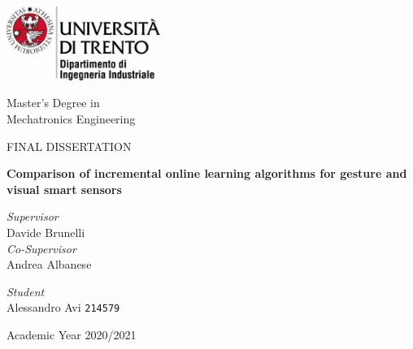 \documentclass [titlepage]{article}
\begin{document}
\begin{titlepage}

    \includegraphics[width=5cm]{Figures/LogoPiccolo.jpg}

   \begin{center}
       \Large{Master's Degree in\\Mechatronics Engineering}

       \vspace{0.5cm}
       \Large{FINAL DISSERTATION}
       
       \vspace{1.5cm}
        \textbf{\huge{Comparison of incremental online learning algorithms for gesture and visual smart sensors}}
            
   \end{center}
   
   \begin{flushleft}
   \large{\textit{Supervisor}\\
   Davide Brunelli}\\
   
   		\vspace{0.2cm}
   		\large{\textit{Co-Supervisor}\\
   		Andrea Albanese}\\   
   
   		\vspace{0.5cm}
   
   		\large{\textit{Student}\\
   		Alessandro Avi \texttt{214579}}
   \end{flushleft}
   
   
   \vspace*{3cm}
   \begin{center}
       \large{Academic Year 2020/2021}
   \end{center}
\end{titlepage}
\end{document}
